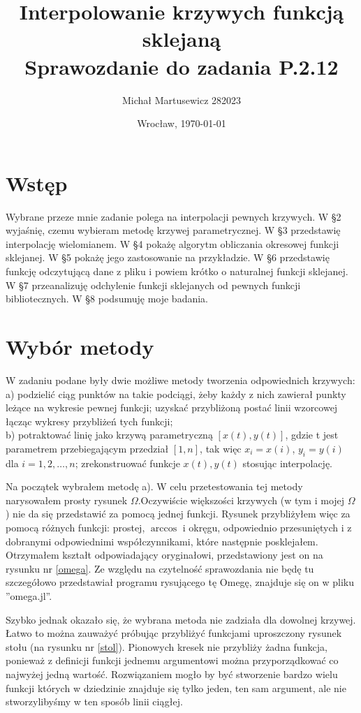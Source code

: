 \documentclass{article}
\author{Michał Martusewicz 282023}
\date{Wrocław, \today}
\title{\textbf{Interpolowanie krzywych funkcją sklejaną}  \\ Sprawozdanie do zadania P.2.12}
\begin{document}
\maketitle
\section{Wstęp}

Wybrane przeze mnie zadanie polega na interpolacji pewnych krzywych.
 W \S 2 wyjaśnię, czemu wybieram metodę krzywej parametrycznej.
 W \S 3 przedstawię interpolację wielomianem.
 W \S 4 pokażę algorytm obliczania okresowej funkcji sklejanej.
 W \S 5 pokażę jego zastosowanie na przykładzie.
 W \S 6 przedstawię funkcję odczytującą dane z pliku i powiem krótko o naturalnej funkcji sklejanej.
 W \S 7 przeanalizuję odchylenie funkcji sklejanych od pewnych funkcji bibliotecznych.
 W \S 8 podsumuję moje badania.
 

\section{Wybór metody}

W zadaniu podane były dwie możliwe metody tworzenia odpowiednich krzywych:
\\

 a) podzielić ciąg punktów na takie podciągi, żeby każdy z nich zawierał punkty leżące na wykresie pewnej funkcji;
uzyskać przybliżoną postać linii wzorcowej łącząc wykresy przybliżeń tych funkcji; \\
b) potraktować linię jako krzywą parametryczną $[x(t), y(t)]$, gdzie t jest parametrem przebiegającym przedział
$[1, n]$, tak więc $x_i = x(i)$, $y_i = y(i)$ dla $i = 1, 2, \ldots , n$; zrekonstruować funkcje $x(t), y(t)$ stosując interpolację.

Na początek wybrałem metodę a). W celu przetestowania tej metody narysowałem prosty rysunek $\Omega$.Oczywiście większości krzywych (w tym i mojej $\Omega$) nie da się przedstawić za pomocą jednej funkcji. Rysunek przybliżyłem więc za pomocą różnych funkcji: prostej, $\arccos$ i okręgu, odpowiednio przesuniętych i z dobranymi odpowiednimi współczynnikami, które następnie posklejałem. Otrzymałem kształt odpowiadający oryginałowi, przedstawiony jest on na rysunku nr \ref{omega}. Ze względu na czytelność sprawozdania nie będę tu szczegółowo przedstawiał programu rysującego tę Omegę, znajduje się on w pliku ''omega.jl''. 

Szybko jednak okazało się, że wybrana metoda nie zadziała dla dowolnej krzywej. Łatwo to można zauważyć próbując przybliżyć funkcjami uproszczony rysunek stołu (na rysunku nr \ref{stol}). Pionowych kresek nie przybliży żadna funkcja, ponieważ z definicji funkcji jednemu argumentowi można przyporządkować co najwyżej jedną wartość. Rozwiązaniem mogło by być stworzenie bardzo wielu funkcji których w dziedzinie znajduje się tylko jeden, ten sam argument, ale nie stworzylibyśmy w ten sposób linii ciągłej.
\end{document}
